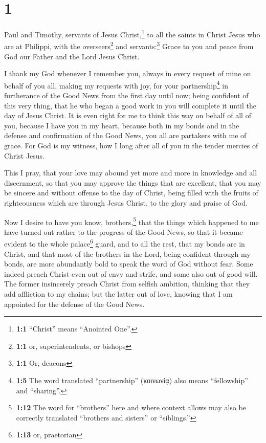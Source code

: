 \hypertarget{section}{%
\section{1}\label{section}}

 Paul and Timothy, servants of Jesus Christ,\footnote{\textbf{1:1}
  ``Christ'' means ``Anointed One''.} to all the saints in Christ Jesus
who are at Philippi, with the overseers\footnote{\textbf{1:1} or,
  superintendents, or bishops} and servants:\footnote{\textbf{1:1} Or,
  deacons}  Grace to you and peace from God our Father and
the Lord Jesus Christ.

 I thank my God whenever I remember you, 
always in every request of mine on behalf of you all, making my requests
with joy,  for your partnership\footnote{\textbf{1:5} The
  word translated ``partnership'' (κοινωνίᾳ) also means ``fellowship''
  and ``sharing''.} in furtherance of the Good News from the first day
until now;  being confident of this very thing, that he
who began a good work in you will complete it until the day of Jesus
Christ.  It is even right for me to think this way on
behalf of all of you, because I have you in my heart, because both in my
bonds and in the defense and confirmation of the Good News, you all are
partakers with me of grace.  For God is my witness, how I
long after all of you in the tender mercies of Christ Jesus.

 This I pray, that your love may abound yet more and more
in knowledge and all discernment,  so that you may
approve the things that are excellent, that you may be sincere and
without offense to the day of Christ,  being filled with
the fruits of righteousness which are through Jesus Christ, to the glory
and praise of God.

 Now I desire to have you know, brothers,\footnote{\textbf{1:12}
  The word for ``brothers'' here and where context allows may also be
  correctly translated ``brothers and sisters'' or ``siblings.''} that
the things which happened to me have turned out rather to the progress
of the Good News,  so that it became evident to the whole
palace\footnote{\textbf{1:13} or, praetorian} guard, and to all the
rest, that my bonds are in Christ,  and that most of the
brothers in the Lord, being confident through my bonds, are more
abundantly bold to speak the word of God without fear. 
Some indeed preach Christ even out of envy and strife, and some also out
of good will.  The former insincerely preach Christ from
selfish ambition, thinking that they add affliction to my chains;
 but the latter out of love, knowing that I am appointed
for the defense of the Good News.

